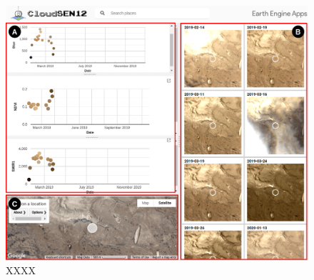 \documentclass[a4paper, nobind]{templates/cdethesis}
\newcommand*{\bibtitle}{Bibliography}
\begin{document}
\begin{figure}[!h]
    \centering
    \includegraphics[width=1\linewidth]{figures/extra/figureS3.png}
    \caption{XXXX}
    \label{fig:figureS03}
\end{figure}


\setlength{\baselineskip}{0pt} %

{\renewcommand*\MakeUppercase[1]{#1}%
\printbibliography[heading=bibintoc,title={\bibtitle}]}
\end{document}
